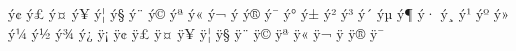 ^^fd^^a2{\Armben}%
^^fd^^a3{\Armgim}%
^^fd^^a4{\Armda}%
^^fd^^a5{\Armyech}%
^^fd^^a6{\Armza}%
^^fd^^a7{\Arme}%
^^fd^^a8{\Armat}%
^^fd^^a9{\Armto}%
^^fd^^aa{\Armzhe}%
^^fd^^ab{\Armini}%
^^fd^^ac{\Armlyun}%
^^fd^^ad{\Armkhe}%
^^fd^^ae{\Armtsa}%
^^fd^^af{\Armken}%
^^fd^^b0{\Armho}%
^^fd^^b1{\Armdza}%
^^fd^^b2{\Armghat}%
^^fd^^b3{\Armtche}%
^^fd^^b4{\Armmen}%
^^fd^^b5{\Armhi}%
^^fd^^b6{\Armnu}%
^^fd^^b7{\Armsha}%
^^fd^^b8{\Armvo}%
^^fd^^b9{\Armcha}%
^^fd^^ba{\Armpe}%
^^fd^^bb{\Armje}%
^^fd^^bc{\Armra}%
^^fd^^bd{\Armse}%
^^fd^^be{\Armvev}%
^^fd^^bf{\Armtyun}%
%
^^ff^^a1{\armayb}%
^^ff^^a2{\armben}%
^^ff^^a3{\armgim}%
^^ff^^a4{\armda}%
^^ff^^a5{\armyech}%
^^ff^^a6{\armza}%
^^ff^^a7{\arme}%
^^ff^^a8{\armat}%
^^ff^^a9{\armto}%
^^ff^^aa{\armzhe}%
^^ff^^ab{\armini}%
^^ff^^ac{\armlyun}%
^^ff^^ad{\armkhe}%
^^ff^^ae{\armtsa}%
^^ff^^af{\armken}%
